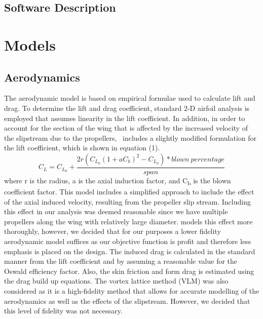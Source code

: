 \documentclass[conf]{new-aiaa}
\begin{document}
\subsection{Software Description}

\section{Models}

\subsection{Aerodynamics}
The aerodynamic model is based on empirical formulae used to calculate lift and drag. To determine the lift and drag coefficient, standard 2-D airfoil analysis is employed that assumes linearity in the lift coefficient. In addition, in order to account for the section of the wing that is affected by the increased velocity of the slipstream due to the propellers,~\cite{first} includes a slightly modified formulation for the lift coefficient, which is shown in equation (1).
\begin{equation}\label{modified_Cl}
C_{L} = C_{L_{0}} + \frac{2r(C_{L_{0}}(1+aC_{b})^{2}-C_{L_{0}})*blown\: percentage}{span}
\end{equation}
where r is the radius, a is the axial induction factor, and C\textsubscript{b} is the blown coefficient factor. This model includes a simplified approach to include the effect of the axial induced velocity, resulting from the propeller slip stream. Including this effect in our analysis was deemed reasonable since we have multiple propellers along the wing with relatively large diameter. \cite{inproceedings_2} models this effect more thoroughly, however, we decided that for our purposes a lower fidelity aerodynamic model suffices as our objective function is profit and therefore less emphasis is placed on the design. The induced drag is calculated in the standard manner from the lift coefficient and by assuming a reasonable value for the Oswald efficiency factor. Also, the skin friction and form drag is estimated using the drag build up equations. The vortex lattice method (VLM) was also considered as it is a high-fidelity method that allows for accurate modelling of the aerodynamics as well as the effects of the slipstream. However, we decided that this level of fidelity was not necessary.
\end{document}
